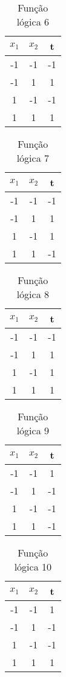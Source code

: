 \begin{table}[H]
\centering
\begin{tabular}{|c|c|c|}
\hline
 $x_1$ & $x_2$ & t\\ \hline
 -1 & -1 & -1\\ \hline
 -1 & 1 & 1\\ \hline
 1 & -1 & -1\\ \hline
 1 & 1 & 1\\ \hline
\end{tabular}
\caption{Função lógica 6}\label{tab:6}\end{table}

\begin{table}[H]
\centering
\begin{tabular}{|c|c|c|}
\hline
 $x_1$ & $x_2$ & t\\ \hline
 -1 & -1 & -1\\ \hline
 -1 & 1 & 1\\ \hline
 1 & -1 & 1\\ \hline
 1 & 1 & -1\\ \hline
\end{tabular}
\caption{Função lógica 7}\label{tab:7}\end{table}

\begin{table}[H]
\centering
\begin{tabular}{|c|c|c|}
\hline
 $x_1$ & $x_2$ & t\\ \hline
 -1 & -1 & -1\\ \hline
 -1 & 1 & 1\\ \hline
 1 & -1 & 1\\ \hline
 1 & 1 & 1\\ \hline
\end{tabular}
\caption{Função lógica 8}\label{tab:8}\end{table}

\begin{table}[H]
\centering
\begin{tabular}{|c|c|c|}
\hline
 $x_1$ & $x_2$ & t\\ \hline
 -1 & -1 & 1\\ \hline
 -1 & 1 & -1\\ \hline
 1 & -1 & -1\\ \hline
 1 & 1 & -1\\ \hline
\end{tabular}
\caption{Função lógica 9}\label{tab:9}\end{table}

\begin{table}[H]
\centering
\begin{tabular}{|c|c|c|}
\hline
 $x_1$ & $x_2$ & t\\ \hline
 -1 & -1 & 1\\ \hline
 -1 & 1 & -1\\ \hline
 1 & -1 & -1\\ \hline
 1 & 1 & 1\\ \hline
\end{tabular}
\caption{Função lógica 10}\label{tab:10}\end{table}

